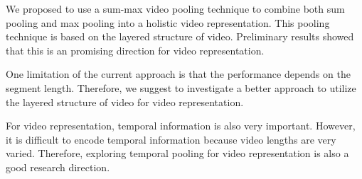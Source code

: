 We proposed to use a sum-max video pooling technique to combine both sum pooling and max pooling into a holistic video representation. This pooling technique is based on the layered structure of video. Preliminary results showed that this is an promising direction for video representation.

One limitation of the current approach is that the performance depends on the segment length. Therefore, we suggest to investigate a better approach to utilize the layered structure of video for video representation.

For video representation, temporal information is also very important. However, it is difficult to encode temporal information because video lengths are very varied. Therefore, exploring temporal pooling for video representation is also a good research direction.  

